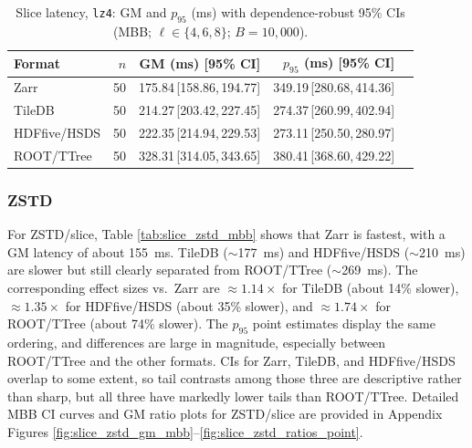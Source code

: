 \documentclass[nomenclature, english, bibtex]{kththesis}
\numberwithin{listing}{chapter}
\begin{document}
\begin{table}[H]
  \centering
  \caption{Slice latency, \texttt{lz4}: \gls{GM} and $p_{95}$ (ms) with dependence-robust 95\% CIs (\gls{MBB}; $\ell\in\{4,6,8\}$; $B{=}10{,}000$).}
  \label{tab:slice_lz4_mbb}
  \begin{tabular}{lrrrr}
    \toprule
    Format & $n$ & \gls{GM} (ms) [95\% \gls{CI}] & $p_{95}$ (ms) [95\% \gls{CI}] \\
    \midrule
    Zarr   & 50 & 175.84\,[158.86,\,194.77] & 349.19\,[280.68,\,414.36] \\
    TileDB & 50 & 214.27\,[203.42,\,227.45] & 274.37\,[260.99,\,402.94] \\
    \gls{HDFfive}/\gls{HSDS}   & 50 & 222.35\,[214.94,\,229.53] & 273.11\,[250.50,\,280.97] \\
    \gls{ROOT}/\gls{TTree}   & 50 & 328.31\,[314.05,\,343.65] & 380.41\,[368.60,\,429.22] \\
    \bottomrule
  \end{tabular}
\end{table}

\subsubsection{\texorpdfstring{\gls{ZSTD}}{zstd}}
For \gls{ZSTD}/slice, Table \ref{tab:slice_zstd_mbb} shows that Zarr is fastest, with a \gls{GM} latency of about 155~ms. TileDB ($\sim$177~ms) and \gls{HDFfive}/\gls{HSDS} ($\sim$210~ms) are slower but still clearly separated from \gls{ROOT}/\gls{TTree} ($\sim$269~ms). The corresponding effect sizes vs.\ Zarr are $\approx 1.14\times$ for TileDB (about 14\% slower), $\approx 1.35\times$ for \gls{HDFfive}/\gls{HSDS} (about 35\% slower), and $\approx 1.74\times$ for \gls{ROOT}/\gls{TTree} (about 74\% slower). The $p_{95}$ point estimates display the same ordering, and differences are large in magnitude, especially between \gls{ROOT}/\gls{TTree} and the other formats. CIs for Zarr, TileDB, and \gls{HDFfive}/\gls{HSDS} overlap to some extent, so tail contrasts among those three are descriptive rather than sharp, but all three have markedly lower tails than \gls{ROOT}/\gls{TTree}. Detailed \gls{MBB} \gls{CI} curves and \gls{GM} ratio plots for \gls{ZSTD}/slice are provided in Appendix Figures \ref{fig:slice_zstd_gm_mbb}–\ref{fig:slice_zstd_ratios_point}.
\end{document}
